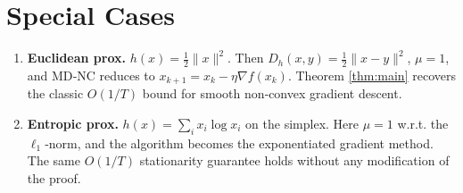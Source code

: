 \documentclass{article}
\newcommand{\grad}{\nabla}
\newcommand{\Breg}{D_h}
\begin{document}
\section*{Special Cases}
\begin{enumerate}[label=\arabic*.]
\item \textbf{Euclidean prox.} $h(x)=\tfrac12\|x\|^{2}$.
    Then $\Breg(x,y)=\tfrac12\|x-y\|^{2}$, $\mu=1$, and MD‑NC reduces to
    $x_{k+1}=x_k-\eta\grad f(x_k)$. Theorem \ref{thm:main} recovers the classic
    $O(1/T)$ bound for smooth non‑convex gradient descent.
\item \textbf{Entropic prox.} $h(x)=\sum_{i}x_i\log x_i$ on the simplex.
    Here $\mu=1$ w.r.t. the $\ell_1$‑norm, and the algorithm becomes the
    exponentiated gradient method. The same $O(1/T)$ stationarity guarantee
    holds without any modification of the proof.
\end{enumerate}
\end{document}
